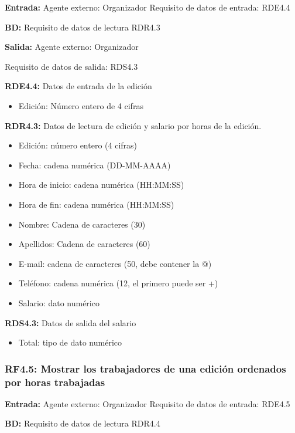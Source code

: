 \textbf{Entrada:} Agente externo: Organizador    Requisito de datos de entrada: RDE4.4

\textbf{BD:} Requisito de datos de lectura RDR4.3

\textbf{Salida:} Agente externo: Organizador

Requisito de datos de salida: RDS4.3

\textbf{RDE4.4:} Datos de entrada de la edición
\begin{itemize}
	\item Edición: Número entero de 4 cifras
\end{itemize}

\textbf{RDR4.3:} Datos de lectura de edición y salario por horas de la edición.
\begin{itemize}
	\item Edición: número entero (4 cifras)
\newline
	\item Fecha: cadena numérica (DD-MM-AAAA)    
    \item Hora de inicio: cadena numérica (HH:MM:SS)
    \item Hora de fin: cadena numérica (HH:MM:SS)
\newline
	\item Nombre: Cadena de caracteres (30)
	\item Apellidos: Cadena de caracteres (60)
	\item E-mail: cadena de caracteres (50, debe contener la @)
	\item Teléfono: cadena numérica (12, el primero puede ser +)
	\item Salario: dato numérico
\end{itemize}

\textbf{RDS4.3:} Datos de salida del salario
 \begin{itemize}
	\item Total: tipo de dato numérico
\end{itemize}



\subsubsection{RF4.5: Mostrar los trabajadores de una edición ordenados por horas trabajadas}

\textbf{Entrada:} Agente externo: Organizador         Requisito de datos de entrada: RDE4.5

\textbf{BD:} Requisito de datos de lectura RDR4.4

